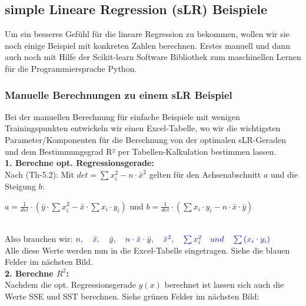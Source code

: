 \documentclass[12pt]{article}
\begin{document}
\subsection{simple Lineare Regression (sLR) Beispiele}

Um ein besseres Gefühl für die lineare Regression zu bekommen, wollen wir sie noch einige Beispiel mit konkreten Zahlen berechnen. Erstes manuell und dann auch noch mit Hilfe der Scikit-learn Software Bibliothek zum maschinellen Lernen für die Programmiersprache Python.\\
\subsubsection{Manuelle Berechnungen zu einem sLR Beispiel}
%
Bei der manuellen Berechnung für einfache Beispiele mit wenigen  Trainingspunkten entwickeln wir einen Excel-Tabelle, wo wir die wichtigsten Parameter/Komponenten für die Berechnung von der optimalen sLR-Geraden und dem Bestimmungsgrad R² per Tabellen-Kalkulation bestimmen lassen.\\

\textbf{1. Berechne opt. Regressionsgerade:}\\[0.2cm]   
Nach (Th-5.2): Mit $ det = \sum{x_i^2} - n \cdot \bar{x}^2 $ gelten für den Achsenabschnitt $a$ und die Steigung $b$:\\[0.2cm]
\begin{large}
$ a = \frac{1}{det} \cdot (\bar{y} \cdot \sum{x_i^2} - \bar{x} \cdot \sum{x_i \cdot y_i}) $ und $ b = \frac{1}{det} \cdot (\sum {x_i \cdot y_i} - n \cdot \bar{x} \cdot \bar{y})$   \\[0.2cm]
\end{large} \\[0.2cm]
Also brauchen wir: ${\color{blue}{ n, \quad \bar{x}, \quad \bar{y}, \quad n \cdot \bar{x} \cdot \bar{y}, \quad \bar{x}^2, \quad \sum{x_i^2} \quad und \quad \sum{(x_i \cdot y_i)}}}$
\\[0.2cm]
Alle diese Werte werden nun in die Excel-Tabelle eingetragen. Siehe die blauen Felder im nächsten Bild.\\[0.1cm]

\textbf{2. Berechne $R^2$:}\\[0.2cm]
Nachdem die opt. Regressionsgerade $y(x)$ berechnet ist lassen sich auch die  Werte SSE und SST berechnen. Siehe grünen Felder im nächsten Bild:\\
\\[1.5cm]
\end{document}

